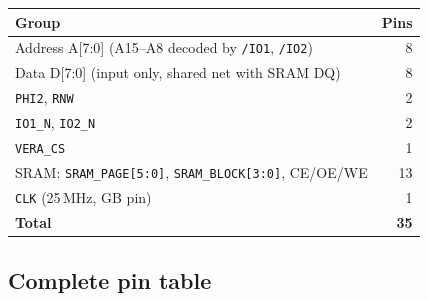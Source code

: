 \documentclass[11pt,a4paper]{article}
\newcommand{\sig}[1]{\texttt{#1}}
\begin{document}
\begin{center}
\begin{tabular}{lr}
\toprule
\textbf{Group} & \textbf{Pins} \\
\midrule
Address A[7:0] (A15--A8 decoded by \sig{/IO1}, \sig{/IO2}) & 8 \\
Data D[7:0] (input only, shared net with SRAM DQ)          & 8 \\
\sig{PHI2}, \sig{RNW}                                      & 2 \\
\sig{IO1\_N}, \sig{IO2\_N}                                 & 2 \\
\sig{VERA\_CS}                                             & 1 \\
SRAM: \sig{SRAM\_PAGE[5:0]}, \sig{SRAM\_BLOCK[3:0]}, CE/OE/WE & 13 \\
\sig{CLK} (25\,MHz, GB pin)                                & 1 \\
\midrule
\textbf{Total}                                             & \textbf{35} \\
\bottomrule
\end{tabular}
\end{center}

\subsection{Complete pin table}
\end{document}
